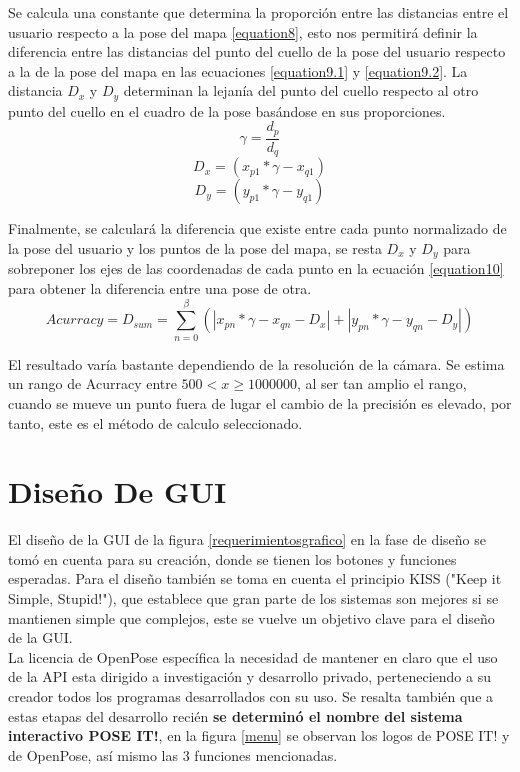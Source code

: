 Se calcula una constante que determina la proporción entre las distancias entre el usuario respecto a la pose del mapa \ref{equation8}, esto nos permitirá definir la diferencia entre las distancias del punto del cuello de la pose del usuario respecto a la de la pose del mapa en las ecuaciones \ref{equation9.1} y \ref{equation9.2}. La distancia $D_x$ y $D_y$ determinan la lejanía del punto del cuello respecto al otro punto del cuello en el cuadro de la pose basándose en sus proporciones.
\begin{equation}
\gamma = \frac{d_p}{d_q}
\label{equation8}
\end{equation}
\begin{equation}
D_x= (x_{p1}*\gamma - x_{q1})
\label{equation9.1}
\end{equation}
\begin{equation}
D_y= (y_{p1}*\gamma - y_{q1})
\label{equation9.2}
\end{equation}

Finalmente, se calculará la diferencia que existe entre cada punto normalizado de la pose del usuario y los puntos de la pose del mapa, se resta $D_x$ y $D_y$ para sobreponer los ejes de las coordenadas de cada punto en la ecuación \ref{equation10} para obtener la diferencia entre una pose de otra. 
\begin{equation}
Acurracy = D_{sum} = \sum_{n=0}^\beta (\left | x_{pn}*\gamma -x_{qn}-D_x \right |+\left | y_{pn}*\gamma -y_{qn}-D_y \right |) 
\label{equation10}
\end{equation}

El resultado varía bastante dependiendo de la resolución de la cámara. Se estima un rango de Acurracy entre $ 500 < x \geq 1000000$, al ser tan amplio el rango, cuando se mueve un punto fuera de lugar el cambio de la precisión es elevado, por tanto, este es el método de calculo seleccionado.



\section{Diseño De GUI}

El diseño de la GUI de la figura \ref{requerimientosgrafico} en la fase de diseño se tomó en cuenta para su creación, donde se tienen los botones y funciones esperadas. Para el diseño también se toma en cuenta el principio KISS ("Keep it Simple, Stupid!"), que establece que gran parte de los sistemas son mejores si se mantienen simple que complejos, este se vuelve un objetivo clave para el diseño de la GUI.
\\
La licencia de OpenPose específica la necesidad de mantener en claro que el uso de la API esta dirigido a investigación y desarrollo privado, perteneciendo a su creador todos los programas desarrollados con su uso.
Se resalta también que a estas etapas del desarrollo recién \textbf{se determinó el nombre del sistema interactivo POSE IT!}, en la figura \ref{menu} se observan los logos de POSE IT! y de OpenPose, así mismo las 3 funciones mencionadas.


